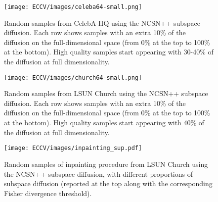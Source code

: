\documentclass{article}
\begin{document}
\begin{figure}
    \centering
    \texttt{[image: ECCV/images/celeba64-small.png]}
    \caption{Random samples from CelebA-HQ using the NCSN++  subspace diffusion. Each row shows samples with an extra 10\% of the diffusion on the  full-dimensional space (from 0\% at the top to 100\% at the bottom). High quality samples start appearing with 30-40\% of the diffusion at full dimensionality.  }
    \label{fig:celeba64}
\end{figure}

\begin{figure}
    \centering
    \texttt{[image: ECCV/images/church64-small.png]}
    \caption{Random samples from LSUN Church using the NCSN++  subspace diffusion. Each row shows samples with an extra 10\% of the diffusion on the  full-dimensional space (from 0\% at the top to 100\% at the bottom). High quality samples start appearing with 40\% of the diffusion at full dimensionality.}
    \label{fig:church64}
\end{figure}

\begin{figure}
    \centering
    \texttt{[image: ECCV/images/inpainting\_sup.pdf]}
    \caption{Random samples of inpainting procedure from LSUN Church using the NCSN++  subspace diffusion, with different proportions of subspace diffusion (reported at the top along with the corresponding Fisher divergence threshold).  }
    \label{fig:inpainting}
\end{figure}
\end{document}
